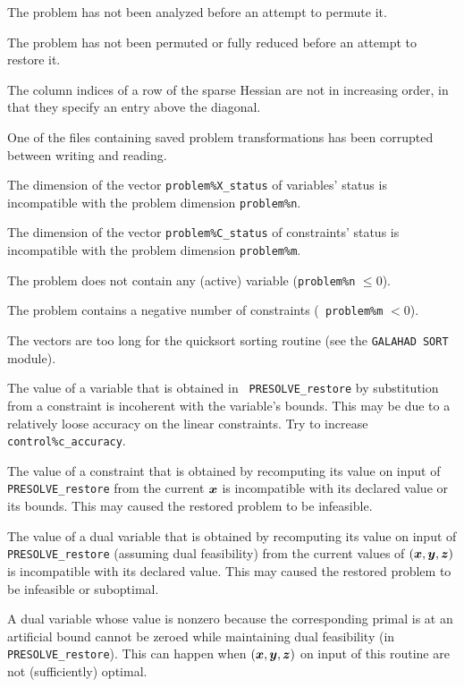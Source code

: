 \documentclass{galahad}
\newcommand{\packagename}{PRESOLVE}
\begin{document}
\begin{description}
 The problem has not been analyzed before an attempt to permute it.

 The problem has not been permuted or fully reduced
before an attempt to restore it.

 The column indices of a row of the sparse Hessian are
not in increasing order, in that they specify an entry above the diagonal.

 One of the files containing saved problem transformations has been
corrupted between  writing and reading.

 The dimension of the vector {\tt problem\%X\_status} of
variables' status is incompatible with the problem dimension {\tt problem\%n}.

 The dimension of the vector {\tt problem\%C\_status} of
constraints' status is incompatible with the problem dimension
{\tt problem\%m}.

 The problem does not contain any (active) variable ({\tt problem\%n}
$\leq 0$).

 The problem contains a negative number of constraints ({\tt
problem\%m} $< 0$).

 The vectors are too long for the quicksort sorting routine (see the
{\tt GALAHAD SORT} module).

 The value of a variable that is obtained in {\tt
\packagename\_restore} by substitution from a constraint is incoherent with
the variable's bounds.  This may be due to a relatively loose accuracy on the
linear constraints. Try to increase {\tt control\%c\_accuracy}.

 The value of a constraint that is obtained by
recomputing its value on input of {\tt \packagename\_restore} from the
current ${\bm{x}}$ is incompatible with its declared value
or its bounds. This may caused the restored problem to be infeasible.

 The value of a dual variable that is obtained by
recomputing its value on input of {\tt \packagename\_restore} (assuming
dual feasibility) from the current values of $( {\bm{x}}, {\bm{y}}, {\bm{z}} )$ is
incompatible with its declared value. This may caused the restored problem to
be infeasible or suboptimal.

 A dual variable whose value is nonzero because the
corresponding primal is at an artificial bound cannot
be zeroed while maintaining dual feasibility
(in {\tt \packagename\_restore}). This can happen when $( {\bm{x}}, {\bm{y}}, {\bm{z}} )$
on  input of this routine are not (sufficiently) optimal.


\end{description}
\end{document}
